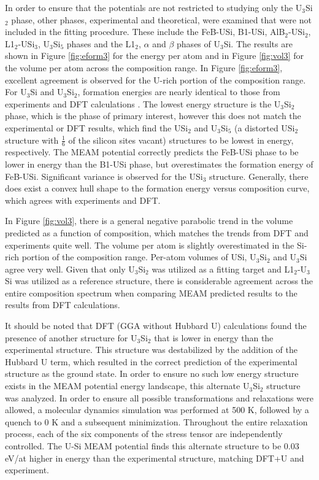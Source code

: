 \documentclass[review]{elsarticle}
\begin{document}
In order to ensure that the potentials are not restricted to studying only the U$_{3}$Si$_{2}$ phase, other phases, experimental and theoretical, were examined that were not included in the fitting procedure.  These include the FeB-USi, B1-USi, AlB$_{2}$-USi$_{2}$, L1$_{2}$-USi$_{3}$, U$_{3}$Si$_{5}$ phases and the L1$_{2}$, $\alpha$ and $\beta$ phases of U$_{3}$Si.  The results are shown in Figure \ref{fig:eform3}  for the energy per atom and in Figure \ref{fig:vol3} for the volume per atom across the composition range.  In Figure \ref{fig:eform3}, excellent agreement is observed for the U-rich portion of the composition range.  For U$_{3}$Si and U$_{3}$Si$_{2}$, formation energies are nearly identical to those from experiments \cite{berche2009} and DFT calculations \cite{noordhoek2016}.  The lowest energy structure is the U$_{3}$Si$_{2}$ phase, which is the phase of primary interest, however this does not match the experimental or DFT results, which find the USi$_{2}$ and U$_{3}$Si$_{5}$ (a distorted USi$_{2}$ structure with $\frac{1}{6}$ of the silicon sites vacant) structures to be lowest in energy, respectively.  The MEAM potential correctly predicts the FeB-USi phase to be lower in energy than the B1-USi phase, but overestimates the formation energy of FeB-USi.  Significant variance is observed for the USi$_{3}$ structure.  Generally, there does exist a convex hull shape to the formation energy versus composition curve, which agrees with experiments \cite{berche2009} and DFT.  

In Figure \ref{fig:vol3}, there is a general negative parabolic trend in the volume predicted as a function of composition, which matches the trends from DFT and experiments quite well.  The volume per atom is slightly overestimated in the Si-rich portion of the composition range.  Per-atom volumes of USi, U$_{3}$Si$_{2}$ and U$_{3}$Si agree very well.  Given that only U$_{3}$Si$_{2}$ was utilized as a fitting target and L1$_{2}$-U$_{3}$Si was utilized as a reference structure, there is considerable agreement across the entire composition spectrum when comparing MEAM predicted results to the results from DFT calculations.   

It should be noted that DFT (GGA without Hubbard U) calculations \cite{noordhoek2016} found the presence of another structure for U$_{3}$Si$_{2}$ that is lower in energy than the experimental structure.  This structure was destabilized by the addition of the Hubbard U term, which resulted in the correct prediction of the experimental structure as the ground state.  In order to ensure no such low energy structure exists in the MEAM potential energy landscape, this alternate U$_{3}$Si$_{2}$ structure was analyzed.  In order to ensure all possible transformations and relaxations were allowed, a molecular dynamics simulation was performed at 500 K, followed by a quench to 0 K and a subsequent minimization.  Throughout the entire relaxation process, each of the six components of the stress tensor are independently controlled.  The U-Si MEAM potential finds this alternate structure to be 0.03 eV/at higher in energy than the experimental structure, matching DFT+U and experiment.  
\end{document}
